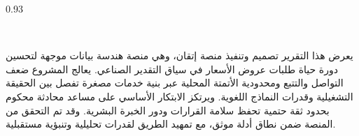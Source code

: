 \begin{spacing}{0.93}
\begin{flushright}
\textbf{}\\[-0.03cm]
\end{flushright}
\begin{RLtext}
يعرض هذا التقرير تصميم وتنفيذ منصة إتقان، وهي منصة هندسة بيانات موجهة لتحسين دورة حياة طلبات عروض الأسعار في سياق التقدير الصناعي. يعالج المشروع ضعف التواصل والتتبع ومحدودية الأتمتة المحلية عبر بنية خدمات مصغرة تفصل بين الحقيقة التشغيلية وقدرات النماذج اللغوية. ويرتكز الابتكار الأساسي على مساعد محادثة محكوم بحدود ثقة حتمية تحفظ سلامة القرارات ودور الخبرة البشرية. وقد تم التحقق من المنصة ضمن نطاق أدلة موثق، مع تمهيد الطريق لقدرات تحليلية وتنبؤية مستقبلية.
\end{RLtext}
\vspace{-0.05cm}
\begin{flushright}
\textbf{} 
\end{flushright}
\end{spacing}
\restoregeometry
